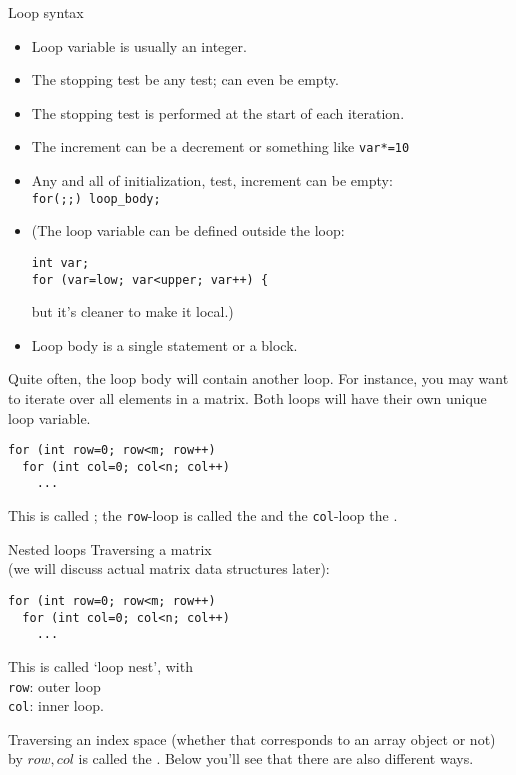 \begin{slide}{Loop syntax}
  \label{sl:for-syntax}
  \begin{itemize}
  \item Loop variable is usually an integer.
  \item The stopping test be any test; can even be empty.
  \item The stopping test is performed at the start of each iteration.
  \item The increment can be a decrement or something like \lstinline{var*=10}
  \item Any and all of initialization, test, increment can be empty:\\
    \lstinline{for(;;) loop_body;}
  \item (The loop variable can be defined outside the loop:
\begin{lstlisting}
int var;
for (var=low; var<upper; var++) {
\end{lstlisting}
but it's cleaner to make it local.)
\item Loop body is a single statement or a block.
  \end{itemize}
\end{slide}

Quite often, the loop body will contain another loop. For instance,
you may want to iterate over all elements in a matrix. Both loops will
have their own unique loop variable.
\begin{lstlisting}
for (int row=0; row<m; row++)
  for (int col=0; col<n; col++)
    ...
\end{lstlisting}
This is called ; 
the \lstinline{row}-loop is called the  and the
\lstinline{col}-loop the .

\begin{slide}{Nested loops}
  \label{sl:for-nest}
  Traversing a matrix\\
  (we will discuss actual matrix data structures later):
\begin{lstlisting}
for (int row=0; row<m; row++)
  for (int col=0; col<n; col++)
    ...
\end{lstlisting}
This is called `loop nest', with\\
\lstinline{row}: outer loop\\
\lstinline{col}: inner loop.
\end{slide}

Traversing an index space (whether that corresponds to an array object
or not) by $row,col$ is called the .
Below you'll see that there are also different
ways.

